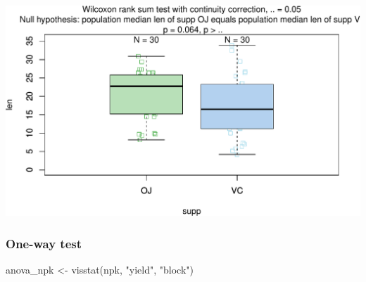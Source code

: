 \documentclass[
]{article}
\newenvironment{Shaded}{\begin{snugshade}}{\end{snugshade}}
\newcommand{\FunctionTok}[1]{\textcolor[rgb]{0.00,0.00,0.00}{#1}}
\newcommand{\NormalTok}[1]{#1}
\newcommand{\OtherTok}[1]{\textcolor[rgb]{0.56,0.35,0.01}{#1}}
\newcommand{\StringTok}[1]{\textcolor[rgb]{0.31,0.60,0.02}{#1}}
\begin{document}
\includegraphics[width=1\linewidth]{man/figures/README-unnamed-chunk-6-1}

\hypertarget{one-way-test}{%
\subsubsection{One-way test}\label{one-way-test}}

\begin{Shaded}
\begin{Highlighting}[]
\NormalTok{anova\_npk }\OtherTok{\textless{}{-}} \FunctionTok{visstat}\NormalTok{(npk, }\StringTok{"yield"}\NormalTok{, }\StringTok{"block"}\NormalTok{)}
\end{Highlighting}
\end{Shaded}
\end{document}
